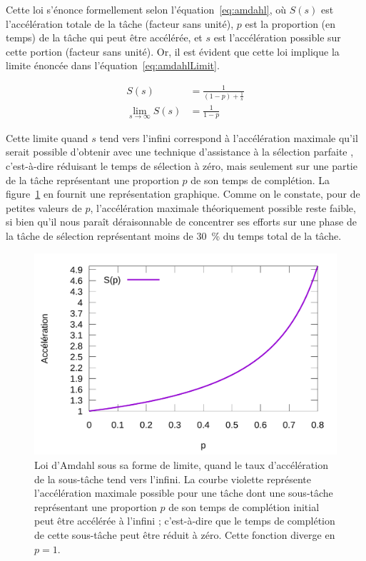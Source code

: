 	Cette loi s'énonce formellement selon l'équation~\ref{eq:amdahl}, où $S(s)$ est l'accélération totale de la tâche (facteur sans unité), $p$ est la proportion (en temps) de la tâche qui peut être accélérée, et $s$ est l'accélération possible sur cette portion (facteur sans unité). Or, il est évident que cette loi implique la limite énoncée dans l'équation~\ref{eq:amdahlLimit}.
	
	\begin{align}
		\label{eq:amdahl}
		S(s) &= \frac{1}{(1-p) + \frac{1}{s}} \\
		\label{eq:amdahlLimit}
		\lim_{s\to\infty} S(s) &= \frac{1}{1-p}
	\end{align}
	
	Cette limite quand $s$ tend vers l'infini correspond à l'accélération maximale qu'il serait possible d'obtenir avec une technique d'assistance à la sélection \og parfaite \fg{}, c'est-à-dire réduisant le temps de sélection à zéro, mais seulement sur une partie de la tâche représentant une proportion $p$ de son temps de complétion. La figure~\ref{fig:amdahl} en fournit une représentation graphique. Comme on le constate, pour de petites valeurs de $p$, l'accélération maximale théoriquement possible reste faible, si bien qu'il nous paraît déraisonnable de concentrer ses efforts sur une phase de la tâche de sélection représentant moins de 30~\%{} du temps total de la tâche.
	
	\begin{figure}[!htb]
		\centering
		\includegraphics[width=\textwidth]{figures/ch4/amdahl}
		\caption[Loi d'Amdahl sous sa forme de limite]{Loi d'Amdahl sous sa forme de limite, quand le taux d'accélération de la sous-tâche tend vers l'infini. La courbe violette représente l'accélération maximale possible pour une tâche dont une sous-tâche représentant une proportion $p$ de son temps de complétion initial peut être accélérée à l'infini ; c'est-à-dire que le temps de complétion de cette sous-tâche peut être réduit à zéro. Cette fonction diverge en $p = 1$.}
		\label{fig:amdahl}
	\end{figure}
	
